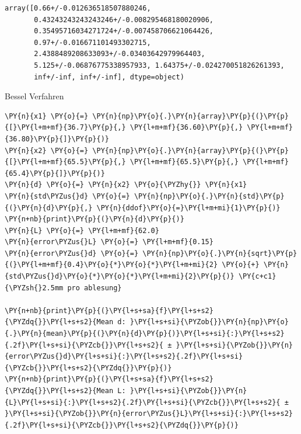             \begin{tcolorbox}[breakable, size=fbox, boxrule=.5pt, pad at break*=1mm, opacityfill=0]
\begin{Verbatim}[commandchars=\\\{\}]
array([0.66+/-0.012636518507880246,
       0.43243243243243246+/-0.008295468180020906,
       0.35495716034271724+/-0.007458706621064426,
       0.97+/-0.016671101493302715,
       2.4388489208633093+/-0.03403642979964403,
       5.125+/-0.06876775338957933, 1.64375+/-0.024270051826261393,
       inf+/-inf, inf+/-inf], dtype=object)
\end{Verbatim}
\end{tcolorbox}
        
    Bessel Verfahren

    \begin{tcolorbox}[breakable, size=fbox, boxrule=1pt, pad at break*=1mm,colback=cellbackground, colframe=cellborder]
\begin{Verbatim}[commandchars=\\\{\}]
\PY{n}{x1} \PY{o}{=} \PY{n}{np}\PY{o}{.}\PY{n}{array}\PY{p}{(}\PY{p}{[}\PY{l+m+mf}{36.7}\PY{p}{,} \PY{l+m+mf}{36.60}\PY{p}{,} \PY{l+m+mf}{36.80}\PY{p}{]}\PY{p}{)}
\PY{n}{x2} \PY{o}{=} \PY{n}{np}\PY{o}{.}\PY{n}{array}\PY{p}{(}\PY{p}{[}\PY{l+m+mf}{65.5}\PY{p}{,} \PY{l+m+mf}{65.5}\PY{p}{,} \PY{l+m+mf}{65.4}\PY{p}{]}\PY{p}{)}
\PY{n}{d} \PY{o}{=} \PY{n}{x2} \PY{o}{\PYZhy{}} \PY{n}{x1}
\PY{n}{std\PYZus{}d} \PY{o}{=} \PY{n}{np}\PY{o}{.}\PY{n}{std}\PY{p}{(}\PY{n}{d}\PY{p}{,} \PY{n}{ddof}\PY{o}{=}\PY{l+m+mi}{1}\PY{p}{)}
\PY{n+nb}{print}\PY{p}{(}\PY{n}{d}\PY{p}{)}
\PY{n}{L} \PY{o}{=} \PY{l+m+mf}{62.0}
\PY{n}{error\PYZus{}L} \PY{o}{=} \PY{l+m+mf}{0.15}
\PY{n}{error\PYZus{}d} \PY{o}{=} \PY{n}{np}\PY{o}{.}\PY{n}{sqrt}\PY{p}{(}\PY{l+m+mf}{0.4}\PY{o}{*}\PY{o}{*}\PY{l+m+mi}{2} \PY{o}{+} \PY{n}{std\PYZus{}d}\PY{o}{*}\PY{o}{*}\PY{l+m+mi}{2}\PY{p}{)} \PY{c+c1}{\PYZsh{}2.5mm pro ablesung}

\PY{n+nb}{print}\PY{p}{(}\PY{l+s+sa}{f}\PY{l+s+s2}{\PYZdq{}}\PY{l+s+s2}{Mean d: }\PY{l+s+si}{\PYZob{}}\PY{n}{np}\PY{o}{.}\PY{n}{mean}\PY{p}{(}\PY{n}{d}\PY{p}{)}\PY{l+s+si}{:}\PY{l+s+s2}{.2f}\PY{l+s+si}{\PYZcb{}}\PY{l+s+s2}{ ± }\PY{l+s+si}{\PYZob{}}\PY{n}{error\PYZus{}d}\PY{l+s+si}{:}\PY{l+s+s2}{.2f}\PY{l+s+si}{\PYZcb{}}\PY{l+s+s2}{\PYZdq{}}\PY{p}{)}
\PY{n+nb}{print}\PY{p}{(}\PY{l+s+sa}{f}\PY{l+s+s2}{\PYZdq{}}\PY{l+s+s2}{Mean L: }\PY{l+s+si}{\PYZob{}}\PY{n}{L}\PY{l+s+si}{:}\PY{l+s+s2}{.2f}\PY{l+s+si}{\PYZcb{}}\PY{l+s+s2}{ ± }\PY{l+s+si}{\PYZob{}}\PY{n}{error\PYZus{}L}\PY{l+s+si}{:}\PY{l+s+s2}{.2f}\PY{l+s+si}{\PYZcb{}}\PY{l+s+s2}{\PYZdq{}}\PY{p}{)}
\end{Verbatim}
\end{tcolorbox}

